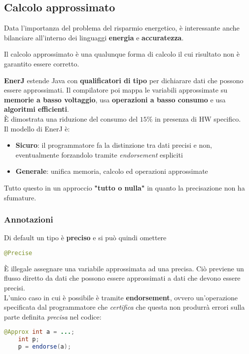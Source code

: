 \subsection{Calcolo approssimato}
Data l'importanza del problema del risparmio energetico, è interessante anche bilanciare all'interno dei linguaggi \textbf{energia} e \textbf{accuratezza}.

\begin{definition}
	Il calcolo 	approssimato è una qualunque forma di calcolo il cui risultato non è garantito essere corretto.
\end{definition}
\textbf{EnerJ} estende Java con \textbf{qualificatori di tipo} per dichiarare dati che possono essere approssimati. Il compilatore poi mappa le variabili approssimate su \textbf{memorie a basso voltaggio}, usa \textbf{operazioni a basso consumo} e usa \textbf{algoritmi efficienti}.\\
È dimostrata una riduzione del consumo del $15\%$ in presenza di HW specifico.\\
Il modello di EnerJ è:
\begin{itemize}
	\item \textbf{Sicuro}: il programmatore fa la distinzione tra dati precisi e non, eventualmente forzandolo tramite \textit{endorsement} espliciti
	\item \textbf{Generale}: unifica memoria, calcolo ed operazioni approssimate
\end{itemize}
Tutto questo in un approccio \textbf{"tutto o nulla"} in quanto la precisazione non ha sfumature.

\subsubsection{Annotazioni}
Di default un tipo è \textbf{preciso} e si può quindi omettere
\begin{lstlisting}[language=Java]
	@Precise
\end{lstlisting}
È illegale assegnare una variabile approssimata ad una precisa. Ciò previene un flusso diretto da dati che possono essere approssimati a dati che devono essere precisi.\\
L'unico caso in cui è possibile è tramite \textbf{endorsement}, ovvero un'operazione specificata dal programmatore che \textit{certifica} che questa non produrrà errori sulla parte definita \textit{precisa} nel codice:
\begin{lstlisting}[language=Java]
	@Approx int a = ...;
	int p;
	p = endorse(a);
\end{lstlisting}

